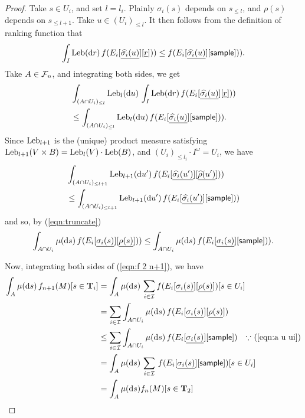 \begin{proof}
Take $s \in U_i$, and set $l = l_i$.
Plainly $\sigma_i(s)$ depends on $s_{\leq l}$, and $\rho(s)$ depends on $s_{\leq l +1}$.
Take $u \in (U_i)_{\leq l}$.
It then follows from the definition of ranking function that
\[
\int_I \mathrm{Leb}(\mathrm{d} r) \, f(E_i[\underline{\widehat{\sigma_i}(u)}][\underline{r}])) \leq f(E_i[\underline{\widehat{\sigma_i}(u)}][\mathsf{sample}])).
\]
Take $A \in \mathcal{F}_n$, and integrating both sides, we get
\begin{align*}
& \int_{(A \cap U_i)_{\leq l}} \mathrm{Leb}_l(\mathrm{d} u) \, \int_I \textrm{Leb}(\mathrm{d} r) \, f(E_i[\underline{\widehat{\sigma_i}(u)}][\underline{r}])) \\
& \leq \int_{(A \cap U_i)_{\leq l}} \mathrm{Leb}_l(\mathrm{d} u) \, f(E_i[\underline{\widehat{\sigma_i}(u)}][\mathsf{sample}])).
\end{align*}
Since $\mathrm{Leb}_{l+1}$ is the (unique) product measure satisfying $\mathrm{Leb}_{l+1}(V \times B) = \mathrm{Leb}_l(V) \cdot \mathrm{Leb}(B)$, and $(U_i)_{\leq l_i} \cdot I^\omega = U_i$, we have
\begin{align*}
& \int_{(A \cap U_i)_{\leq l+1}} \mathrm{Leb}_{l+1}(\mathrm{d} u') \, f(E_i[\underline{\widehat{\sigma_i}(u')}][\underline{\widehat{\rho}(u')}])) \\
& \leq 
\int_{(A \cap U_i)_{\leq l+1}} \mathrm{Leb}_{l+1}(\mathrm{d} u') \, f(E_i[\underline{\widehat{\sigma_i}(u')}][\mathsf{sample}]))
\end{align*}
and so, by (\ref{eqn:truncate})
\begin{equation}
\int_{A \cap U_i} \mu(\mathrm{d} s) \, f(E_i[\underline{\sigma_i(s)}][\underline{\rho(s)}])) \\
\leq 
\int_{A \cap U_i} \mu(\mathrm{d} s) \, f(E_i[\underline{\sigma_i(s)}][\mathsf{sample}])).
\label{eqn:a u ui}
\end{equation}

Now, integrating both sides of (\ref{eqn:f 2 n+1}), we have
\begin{align*}
\int_A \mu(\mathrm{d} s) \, f_{n+1}(M)[s \in \mathbf{T}_i] 
&= 
\int_A \mu(\mathrm{d} s) \, \sum_{i \in \mathcal{I}} f(E_i[\underline{\sigma_i(s)}][\underline{\rho(s)}])[s \in U_i] \\
&= 
\sum_{i \in \mathcal{I}} \int_{A \cap U_i} \mu(\mathrm{d} s) \, f(E_i[\underline{\sigma_i(s)}][\underline{\rho(s)}])\\
&\leq 
\sum_{i \in \mathcal{I}} \int_{A \cap U_i} \mu(\mathrm{d} s) \, f(E_i[\underline{\sigma_i(s)}][\mathsf{sample}])
\quad \hbox{$\because$ (\ref{eqn:a u ui})}\\
&= 
\int_{A} \mu(\mathrm{d} s) \, \sum_{i \in \mathcal{I}} \, f(E_i[\underline{\sigma_i(s)}][\mathsf{sample}])[s \in U_i]\\
&= \int_{A} \mu(\mathrm{d} s) f_{n}(M)[s \in \mathbf{T}_2]
\end{align*}

\end{proof}

